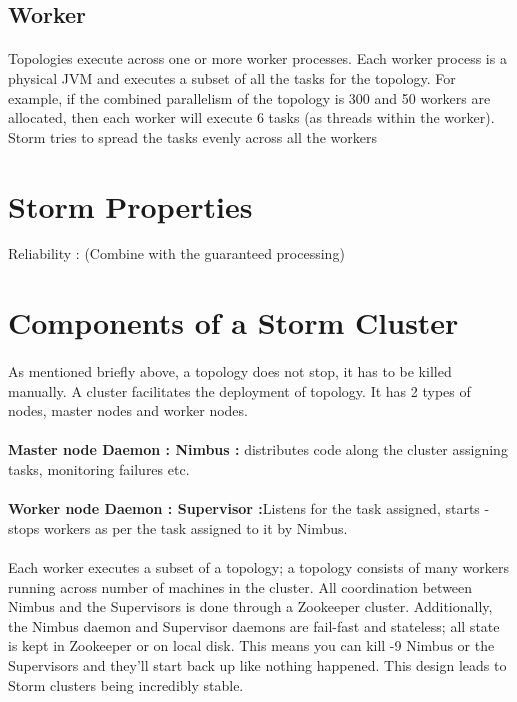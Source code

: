 \documentclass{article}
\begin{document}
    \subsection{Worker}
    \paragraph{}
    Topologies execute across one or more worker processes. Each worker process
    is a physical JVM and executes a subset of all the tasks for the topology.
    For example, if the combined parallelism of the topology is 300 and 50
    workers are allocated, then each worker will execute 6 tasks (as threads
    within the worker). Storm tries to spread the tasks evenly across all the
    workers \section{Storm Properties} Reliability : (Combine with the
    guaranteed processing)

    \section{Components of a Storm Cluster}
    \paragraph{}
    As mentioned briefly above, a topology does not stop, it has to be killed
    manually. A cluster facilitates the deployment of topology. It has 2 types
    of nodes, master nodes and worker nodes. 
    \paragraph{}
    \textbf{Master node Daemon : Nimbus :}
    distributes code along the cluster assigning tasks, monitoring failures etc.
    \paragraph{}
    \textbf{Worker node Daemon : Supervisor :}Listens for the task assigned, starts -
    stops workers as per the task assigned to it by Nimbus. 
    \paragraph{}
    Each worker executes a subset of a topology; a topology consists of many workers running across
    number of machines in the cluster. All coordination between Nimbus and the
    Supervisors is done through a Zookeeper cluster. Additionally, the Nimbus
    daemon and Supervisor daemons are fail-fast and stateless; all state is kept
    in Zookeeper or on local disk. This means you can kill -9 Nimbus or the
    Supervisors and they'll start back up like nothing happened. This design
    leads to Storm clusters being incredibly stable.
\end{document}

